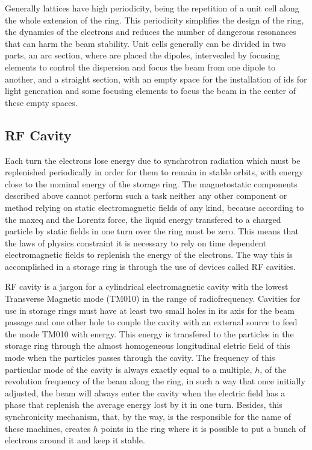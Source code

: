     Generally lattices have high periodicity, being the repetition of a unit cell along the whole extension of the ring. This periodicity simplifies the design of the ring, the dynamics of the electrons and reduces the number of dangerous resonances that can harm the beam stability. Unit cells generally can be divided in two parts, an arc section, where are placed the dipoles, intervealed by focusing elements to control the dispersion and focus the beam from one dipole to another, and a straight section, with an empty space for the installation of \gls{ids} for light generation and some focusing elements to focus the beam in the center of these empty spaces.

\subsection{RF Cavity}

    Each turn the electrons lose energy due to synchrotron radiation which must be replenished periodically in order for them to remain in stable orbits, with energy close to the nominal energy of the storage ring. The magnetostatic components described above cannot perform such a task neither any other component or method relying on static electromagnetic fields of any kind, because according to the \gls{maxeq} and the Lorentz force, the liquid energy transfered to a charged particle by static fields in one turn over the ring must be zero. This means that the laws of physics constraint it is necessary to rely on time dependent electromagnetic fields to replenish the energy of the electrons. The way this is accomplished in a storage ring is through the use of devices called RF cavities.

    RF cavity is a jargon for a cylindrical electromagnetic cavity with the lowest Transverse Magnetic mode (TM010) in the range of radiofrequency. Cavities for use in storage rings must have at least two small holes in its axis for the beam passage and one other hole to couple the cavity with an external source to feed the mode TM010 with energy. This energy is transfered to the particles in the storage ring through the almost homogeneous longitudinal eletric field of this mode when the particles passes through the cavity. The frequency of this particular mode of the cavity is always exactly equal to a multiple, $h$, of the revolution frequency of the beam along the ring, in such a way that once initially adjusted, the beam will always enter the cavity when the electric field has a phase that replenish the average energy lost by it in one turn. Besides, this synchronicity mechanism, that, by the way, is the responsible for the name of these machines, creates $h$ points in the ring where it is possible to put a bunch of electrons around it and keep it stable.

